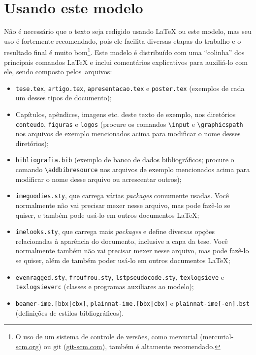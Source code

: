 
\chapter{Usando este modelo}

Não é necessário que o texto seja redigido usando \LaTeX{} ou este modelo,
mas seu uso é fortemente recomendado, pois ele facilita diversas etapas do
trabalho e o resultado final é muito bom\footnote{O uso de um sistema de
controle de versões, como mercurial (\url{mercurial-scm.org}) ou git
(\url{git-scm.com}), também é altamente recomendado.}. Este modelo é
distribuído com uma ``colinha'' dos principais comandos \LaTeX{} e
inclui comentários explicativos para auxiliá-lo com ele, sendo composto
pelos~arquivos:

\enlargethispage{-1\baselineskip}

\begin{itemize}
  \item \texttt{tese.tex}, \texttt{artigo.tex}, \texttt{apresentacao.tex}
        e \texttt{poster.tex} (exemplos de cada um desses tipos de documento);
  \item Capítulos, apêndices, imagens etc. deste texto de exemplo, nos
        diretórios \texttt{conteudo}, \texttt{figuras} e \texttt{logos}
        (procure os comandos \texttt{\textbackslash{}input} e
        \texttt{\textbackslash{}graphicspath} nos arquivos de exemplo
        mencionados acima para modificar o nome desses diretórios);
  \item \texttt{bibliografia.bib} (exemplo de banco de dados bibliográficos;
        procure o comando \texttt{\textbackslash{}addbibresource} nos
        arquivos de exemplo mencionados acima para modificar o nome desse
        arquivo ou acrescentar outros);
  \item \texttt{imegoodies.sty}, que carrega várias \emph{packages} comumente
        usadas. Você normalmente não vai precisar mexer nesse arquivo, mas
        pode fazê-lo se quiser, e também pode usá-lo em outros documentos
        \LaTeX{};
  \item \texttt{imelooks.sty}, que carrega mais \emph{packages} e define
        diversas opções relacionadas à aparência do documento, inclusive
        a capa da tese. Você normalmente também não vai precisar mexer
        nesse arquivo, mas pode fazê-lo se quiser, além de também poder
        usá-lo em outros documentos \LaTeX{};
  \item \texttt{evenragged.sty}, \texttt{froufrou.sty}, \texttt{lstpseudocode.sty},
        \texttt{texlogsieve} e \texttt{texlogsieverc} (classes e programas
        auxiliares ao modelo);
  \item \texttt{beamer-ime.[bbx|cbx]}, \texttt{plainnat-ime.[bbx|cbx]} e
        \texttt{plainnat-ime[-en].bst} (definições de estilos bibliográficos).
\end{itemize}

